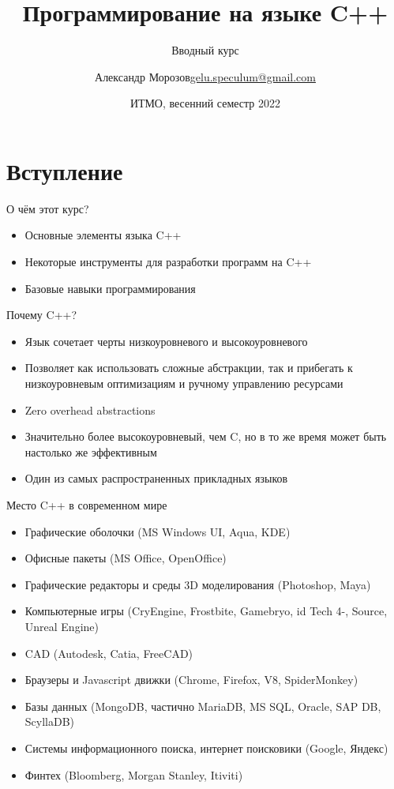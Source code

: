 \documentclass[unknownkeysallowed,xcolor=table]{beamer}
\title[C++]
{Программирование на языке C++}
\subtitle{Вводный курс}
\author[А.~Б.~Морозов]
{
  \texorpdfstring{Александр Морозов\newline\href{mailto:gelu.speculum@gmail.com}{gelu.speculum@gmail.com}}
  {Александр Морозов}
}
\date[ITMO 2022]
{ИТМО, весенний семестр 2022}
\begin{document}
 
\frame{\titlepage}

\section{Вступление}

\begin{frame}{О чём этот курс?}
  \begin{itemize}
    \item Основные элементы языка C++ \vspace{3em}
    \item Некоторые инструменты для разработки программ на C++ \vspace{3em}
    \item Базовые навыки программирования
  \end{itemize}
\end{frame}

\begin{frame}{Почему C++?}
  \begin{itemize}
    \item Язык сочетает черты низкоуровневого и высокоуровневого \vspace{1em}
    \item Позволяет как использовать сложные абстракции, так и прибегать к низкоуровневым оптимизациям и ручному управлению ресурсами \vspace{1em}
    \item Zero overhead abstractions \vspace{1em}
    \item Значительно более высокоуровневый, чем C, но в то же время может быть настолько же эффективным \vspace{1em}
    \item Один из самых распространенных прикладных языков
  \end{itemize}
\end{frame}

\begin{frame}{Место C++ в современном мире}
  \begin{itemize}
    \item Графические оболочки (MS Windows UI, Aqua, KDE)
    \item Офисные пакеты (MS Office, OpenOffice)
    \item Графические редакторы и среды 3D моделирования (Photoshop, Maya)
    \item Компьютерные игры (CryEngine, Frostbite, Gamebryo, id Tech 4-, Source, Unreal Engine)
    \item CAD (Autodesk, Catia, FreeCAD)
    \item Браузеры и Javascript движки (Chrome, Firefox, V8, SpiderMonkey)
    \item Базы данных (MongoDB, частично MariaDB, MS SQL, Oracle, SAP DB, ScyllaDB)
    \item Системы информационного поиска, интернет поисковики (Google, Яндекс)
    \item Финтех (Bloomberg, Morgan Stanley, Itiviti)
  \end{itemize}
\end{frame}
\end{document}
